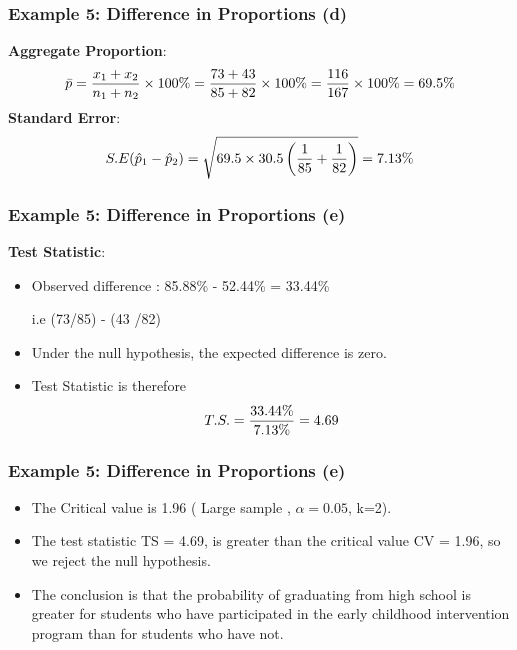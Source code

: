 \documentclass[a4]{beamer}
\begin{document}
\begin{frame}
\frametitle{Example 5: Difference in Proportions (d)}
\textbf{Aggregate Proportion}:\\
\[ \bar{p}  = {x_1  + x_2 \over n_1 + n_2} \times 100\% = {73+43 \over 85 + 82} \times 100\% = { 116 \over 167}\times 100\% = 69.5\% \]
\textbf{Standard Error}:\\
\[ S.E (\hat{p}_1 - \hat{p}_2)  =  \sqrt{69.5 \times 30.5 \left( {1 \over 85} + {1 \over 82}  \right)}  = 7.13\% \]
\end{frame}



\begin{frame}
\frametitle{Example 5: Difference in Proportions (e)}
\textbf{Test Statistic}:
\begin{itemize} \item Observed difference :
85.88\% - 52.44\%  = 33.44\% \item [ i.e (73/85) - (43 /82) ]
\item Under the null hypothesis, the expected difference is zero.
\item Test Statistic is therefore \[T.S. = {33.44\% \over 7.13\%} = 4.69\]
\end{itemize}

\end{frame}
\begin{frame}
\frametitle{Example 5: Difference in Proportions (e)}
\begin{itemize}
\item The Critical value is 1.96 ( Large sample , $\alpha = 0.05$, k=2).

\item The test statistic TS = 4.69, is greater than the critical value CV = 1.96, so we reject the null hypothesis.
\item The conclusion is that the probability of graduating from high school is greater for students who have participated in the early childhood intervention program than for students who have not.
\end{itemize}

\end{frame}
\end{document}
